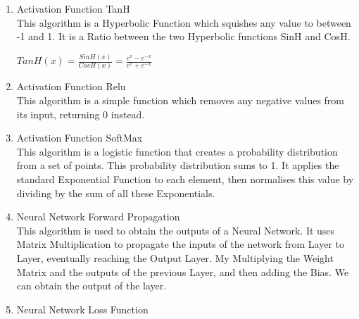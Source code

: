 \begin{flushleft}
\begin{enumerate}
\begin{enumerate}[label=\arabic*)]
                \vspace{0.5cm}
                \item Activation Function TanH \\
                This algorithm is a Hyperbolic Function which squishes any value to between -1 and 1. It is a Ratio between the two Hyperbolic 
                functions SinH and CosH.

                \vspace{0.2cm}
                {\Large\centerline{$TanH(x) = \frac{SinH(x)}{CosH(x)} = \frac{e^x - e^{-x}}{e^x + e^{-x}}$}}
                \vspace{0.2cm}

                \vspace{0.5cm}
                \item Activation Function Relu \\
                This algorithm is a simple function which removes any negative values from its input, returning 0 instead.
                
                \vspace{0.5cm}
                \item Activation Function SoftMax \\
                This algorithm is a logistic function that creates a probability distribution from a set of points. This probability 
                distribution sums to 1. It applies the standard Exponential Function to each element, then normalises this value by dividing
                by the sum of all these Exponentials.

                \vspace{0.5cm}
                \item Neural Network Forward Propagation \\
                This algorithm is used to obtain the outputs of a Neural Network. It uses Matrix Multiplication to propagate the inputs
                of the network from Layer to Layer, eventually reaching the Output Layer. My Multiplying the Weight Matrix and the outputs
                of the previous Layer, and then adding the Bias. We can obtain the output of the layer.
                
                \vspace{0.5cm}
                \item Neural Network Loss Function \\
                

\end{enumerate}
\end{enumerate}
\end{flushleft}
